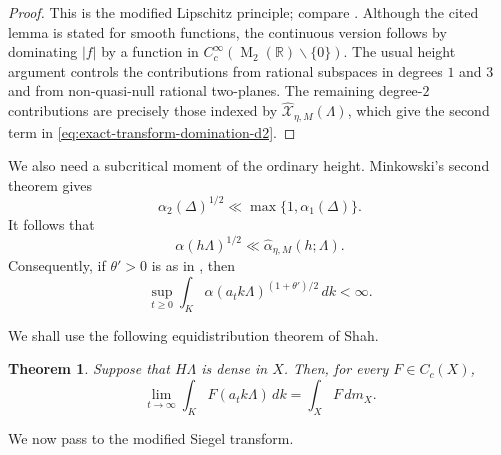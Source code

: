 \documentclass[reqno,11pt]{amsart}
\newtheorem{theorem}{Theorem}[section]
\theoremstyle{definition}
\theoremstyle{remark}
\numberwithin{equation}{section}
\newcommand{\M}{\operatorname{M}}
\begin{document}
\begin{proof}
This is the modified Lipschitz principle; compare
\cite[Lemma~2.7]{Kim}. Although the cited lemma is stated for smooth
functions, the continuous version follows by dominating $|f|$ by a function
in $C_c^\infty(\M_2(\mathbb R)\smallsetminus\{0\})$. The usual height
argument controls the contributions
from rational subspaces in degrees $1$ and $3$ and from non-quasi-null
rational two-planes. The remaining degree-$2$ contributions are precisely
those indexed by
$\widehat{\mathcal X}_{\eta,M}(\Lambda)$, which give the second term in
\eqref{eq:exact-transform-domination-d2}.
\end{proof}

We also need a subcritical moment of the ordinary height. Minkowski's
second theorem gives
$$
\alpha_2(\Delta)^{1/2}
\ll
\max\{1,\alpha_1(\Delta)\}.
$$
It follows that
$$
\alpha(h\Lambda)^{1/2}
\ll
\widehat\alpha_{\eta,M}(h;\Lambda).
$$
Consequently, if $\theta'>0$ is as in , then
\begin{equation}\label{eq:ordinary-subcritical-K-d2}
\sup_{t\ge0}
\int_K
\alpha(a_tk\Lambda)^{(1+\theta')/2}\,dk
<
\infty.
\end{equation}

We shall use the following equidistribution theorem of Shah.


\begin{theorem}\cite{shah}
\label{shah}
Suppose that $H\Lambda$ is dense in $X$. Then, for every $F\in C_c(X)$,
$$
\lim_{t\to\infty}
\int_KF(a_tk\Lambda)\,dk
=
\int_XF\,dm_X.
$$
\end{theorem}
We now pass to the modified Siegel
transform.
\end{document}

